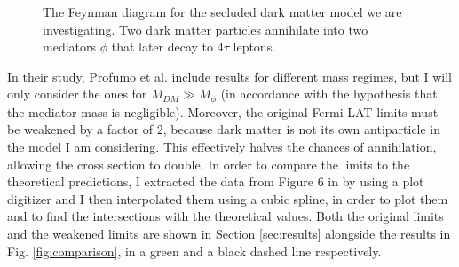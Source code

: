\begin{figure}[htbp]
	\centering
	\caption{The Feynman diagram for the secluded dark matter model we are investigating. Two dark matter particles annihilate into two mediators \(\phi \) that later decay to \(4\tau \) leptons.}
	\label{fig:feynman}
\end{figure}

In their study, Profumo et al. include results for different mass regimes, but I will only consider the ones for \(M_{DM} \gg M_{\phi } \) (in accordance with the hypothesis that the mediator mass is negligible). Moreover, the original Fermi-LAT limits must be weakened by a factor of \(2\), because dark matter is not its own antiparticle in the model I am considering.
This effectively halves the chances of annihilation, allowing the cross section to double. In order to compare the limits to the theoretical predictions, I extracted the data from Figure 6 in \cite{Profumo_2018} by using a plot digitizer and I then interpolated them using a cubic spline, in order to plot them and to find the intersections with the theoretical values.
Both the original limits and the weakened limits are shown in Section \ref{sec:results} alongside the results in Fig. \ref{fig:comparison}, in a green and a black dashed line respectively.

